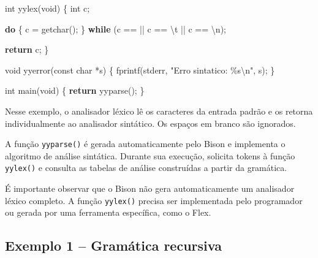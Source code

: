 \documentclass[
  brazilian,
  letterpaper,
]{book}
\newenvironment{Shaded}{\begin{snugshade}}{\end{snugshade}}
\newcommand{\CharTok}[1]{\textcolor[rgb]{0.13,0.47,0.30}{#1}}
\newcommand{\ControlFlowTok}[1]{\textcolor[rgb]{0.00,0.23,0.31}{\textbf{#1}}}
\newcommand{\DataTypeTok}[1]{\textcolor[rgb]{0.68,0.00,0.00}{#1}}
\newcommand{\NormalTok}[1]{\textcolor[rgb]{0.00,0.23,0.31}{#1}}
\newcommand{\OperatorTok}[1]{\textcolor[rgb]{0.37,0.37,0.37}{#1}}
\newcommand{\SpecialCharTok}[1]{\textcolor[rgb]{0.37,0.37,0.37}{#1}}
\newcommand{\StringTok}[1]{\textcolor[rgb]{0.13,0.47,0.30}{#1}}
\theoremstyle{plain}
\theoremstyle{definition}
\theoremstyle{remark}
\begin{document}
\begin{Shaded}
\begin{Highlighting}[]
\DataTypeTok{int}\NormalTok{ yylex}\OperatorTok{(}\DataTypeTok{void}\OperatorTok{)}
\OperatorTok{\{}
    \DataTypeTok{int}\NormalTok{ c}\OperatorTok{;}

    \ControlFlowTok{do} \OperatorTok{\{}
\NormalTok{        c }\OperatorTok{=}\NormalTok{ getchar}\OperatorTok{();}
    \OperatorTok{\}} \ControlFlowTok{while} \OperatorTok{(}\NormalTok{c }\OperatorTok{==} \CharTok{\textquotesingle{} \textquotesingle{}} \OperatorTok{||}\NormalTok{ c }\OperatorTok{==} \CharTok{\textquotesingle{}}\SpecialCharTok{\textbackslash{}t}\CharTok{\textquotesingle{}} \OperatorTok{||}\NormalTok{ c }\OperatorTok{==} \CharTok{\textquotesingle{}}\SpecialCharTok{\textbackslash{}n}\CharTok{\textquotesingle{}}\OperatorTok{);}

    \ControlFlowTok{return}\NormalTok{ c}\OperatorTok{;}
\OperatorTok{\}}

\DataTypeTok{void}\NormalTok{ yyerror}\OperatorTok{(}\DataTypeTok{const} \DataTypeTok{char} \OperatorTok{*}\NormalTok{s}\OperatorTok{)}
\OperatorTok{\{}
\NormalTok{    fprintf}\OperatorTok{(}\NormalTok{stderr}\OperatorTok{,} \StringTok{"Erro sintatico: }\SpecialCharTok{\%s\textbackslash{}n}\StringTok{"}\OperatorTok{,}\NormalTok{ s}\OperatorTok{);}
\OperatorTok{\}}

\DataTypeTok{int}\NormalTok{ main}\OperatorTok{(}\DataTypeTok{void}\OperatorTok{)}
\OperatorTok{\{}
    \ControlFlowTok{return}\NormalTok{ yyparse}\OperatorTok{();}
\OperatorTok{\}}
\end{Highlighting}
\end{Shaded}

Nesse exemplo, o analisador léxico lê os caracteres da entrada padrão e
os retorna individualmente ao analisador sintático. Os espaços em branco
são ignorados.

A função \texttt{yyparse()} é gerada automaticamente pelo Bison e
implementa o algoritmo de análise sintática. Durante sua execução,
solicita tokens à função \texttt{yylex()} e consulta as tabelas de
análise construídas a partir da gramática.

É importante observar que o Bison não gera automaticamente um analisador
léxico completo. A função \texttt{yylex()} precisa ser implementada pelo
programador ou gerada por uma ferramenta específica, como o Flex.

\subsection{Exemplo 1 -- Gramática
recursiva}\label{exemplo-1-gramuxe1tica-recursiva}
\end{document}
